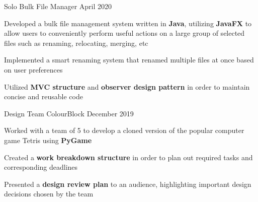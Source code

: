 
\begin{cventries}
  \cventry
    {Solo} %
    {Bulk File Manager} %
    {} %
    {April 2020} %
    {
      \begin{cvitems} %
        \item {Developed a bulk file management system written in \textbf{Java}, utilizing \textbf{JavaFX} to allow users to conveniently perform useful actions on a large group of selected files such as renaming, relocating, merging, etc}
		\item {Implemented a smart renaming system that renamed multiple files at once based on user preferences}
		\item {Utilized \textbf{MVC structure} and \textbf{observer design pattern} in order to maintain concise and reusable code}
      \end{cvitems}
    }

  \cventry
    {Design Team} %
    {ColourBlock} %
    {} %
    {December 2019} %
    {
      \begin{cvitems} %
      	\item {Worked with a team of 5 to develop a cloned version of the popular computer game Tetris using \textbf{PyGame}}
		\item {Created a \textbf{work breakdown structure} in order to plan out required tasks and corresponding deadlines}
		\item {Presented a \textbf{design review plan} to an audience, highlighting important design decisions chosen by the team}
      \end{cvitems}
    }
    

\end{cventries}
